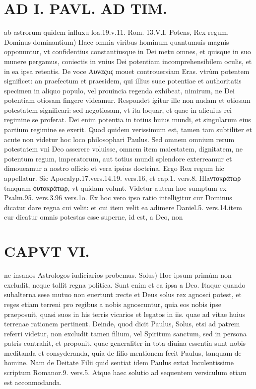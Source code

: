 \documentclass{article}
\begin{document}
\begin{pages}
\section*{AD I. PAVL. AD TIM. }
\marginpar{[ p.402 ]}\pstart ab astrorum quidem influxu loa.19.v.11. Rom. 13.V.I.  \pend\pstart Potens, Rex regum, Dominus dominantium) Haec omnia viribus hominum quantumuis magnis opponuntur, vt confidentius constantiusque  in Dei metu omnes, et quisque in suo munere pergamus, coniectis in vnius Dei potentiam incomprehensibilem oculis, et in ea ipsa retentis. De voce Aυναςuς mouet controuersiam Eras. vtrùm potentem significet: an praefectum et praesidem, qui illius suae potentiae et authoritatis specimen in aliquo populo, vel prouincia regenda exhibeat, nimirum, ne Dei potentiam otiosam fingere videamur. Respondet igitur ille non nudam et otiosam potestatem significari: sed negotiosam, vt ita loquar, et quae in alicuius rei regimine se proferat. Dei enim potentia in totius huius mundi, et singularum eius partium regimine se exerit. Quod quidem verissimum est, tamen tam subtiliter et acute non videtur hoc loco philosophari Paulus. Sed omnem omnium rerum potestatem vni Deo asserere voluisse, omnem item maiestatem, dignitatem, ne potentum regum, imperatorum, aut totius mundi splendore exterreamur et dimoueamur a nostro officio et vera ipsius doctrina. Ergo Rex regum hic appellatur. Sic Apocalyp.17.vers.14.19. vers.16, et cap.1. vers.8. Hlaντοκράτωρ tanquam ὀυτοκράτωρ, vt quidam volunt. Videtur autem hoc sumptum ex Psalm.95. vers.3.96 vers.1o. Ex hoc vero ipso ratio intelligitur cur Dominus dicatur dare regna cui velit: et cui item velit ea adimere Daniel.5. vers.14.item cur dicatur omnis potestas esse superne, id est, a Deo, non  \pend
\section*{CAPVT  VI. }
\marginpar{[ p.483 ]}\pstart ne insanos Astrologos iudiciarios probemus.  \pend\pstart Solus) Hoc ipsum primùm non excludit, neque  tollit regna politica. Sunt enim et ea ipsa a Deo. Itaque quando subalterna sese mutuo non euertunt :recte et Deus solus rex agnosci potest, et reges etiam terreni pro regibus a nobis agnoscuntur, quia eos nobis ipse praeposuit, quasi suos in his terris vicarios et legatos in iis. quae ad vitae huius terrenae rationem pertinent. Deinde, quod dicit Paulus, Solus, etsi ad patrem referri videtur, non excludit tamen filium, vel Spiritum sanctum, sed in persona patris contrahit, et proponit, quae generaliter in tota diuina essentia sunt nobis meditanda et consyderanda, quia de filio mentionem fecit Paulus, tanquam de homine. Nam de Deitate Filii quid sentiat idem Paulus extat luculentissime scriptum Romanor.9. vers.5. Atque haec solutio ad sequentem versiculum etiam est acconmodanda.  \pend
{}
{}

\end{pages}
\end{document}
